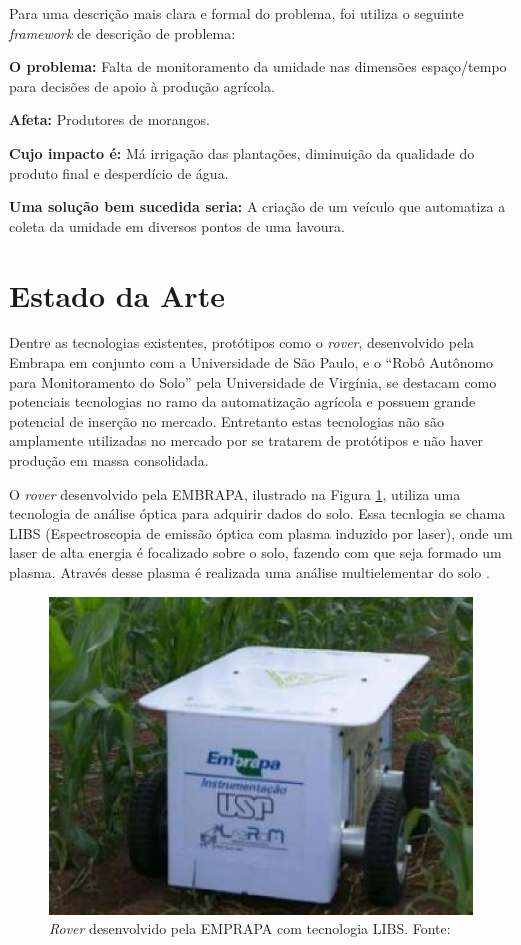   Para uma descrição mais clara e formal do problema, foi utiliza o seguinte
  \textit{framework} de descrição de problema:

  \textbf{O problema:} Falta de monitoramento da umidade nas dimensões espaço/tempo
  para decisões de apoio à produção agrícola.

  \textbf{Afeta:} Produtores de morangos.

  \textbf{Cujo impacto é:} Má irrigação das plantações, diminuição da qualidade
  do produto final e desperdício de água.

  \textbf{Uma solução bem sucedida seria:} A criação de um veículo que automatiza
  a coleta da umidade em diversos pontos de uma lavoura.

  \vfill
  \pagebreak

  \section{Estado da Arte}

  Dentre as tecnologias existentes, protótipos como o \textit{rover}, desenvolvido pela
  Embrapa em conjunto com a Universidade de São Paulo, e o “Robô Autônomo para
  Monitoramento do Solo” pela Universidade de Virgínia, se destacam como
  potenciais tecnologias no ramo da automatização agrícola e possuem grande
  potencial de inserção no mercado.  Entretanto estas tecnologias não são
  amplamente utilizadas no mercado por se tratarem de protótipos e não haver
  produção em massa consolidada.

  O \textit{rover} desenvolvido pela EMBRAPA, ilustrado na Figura \ref{fig02}, utiliza uma tecnologia de análise óptica
  para adquirir dados do solo. Essa tecnlogia se chama LIBS (Espectroscopia de
  emissão óptica com plasma induzido por laser), onde um laser de alta energia
  é focalizado sobre o solo, fazendo com que seja formado um plasma.
  Através desse plasma é realizada uma análise multielementar do solo \cite{ARCHILA2014}.

  \begin{figure}[h]
    \centering
    \includegraphics[keepaspectratio=true,scale=0.5]{figuras/fig02.eps}
    \caption{\textit{Rover} desenvolvido pela EMPRAPA com tecnologia LIBS. Fonte: \cite{ARCHILA2014}}
    \label{fig02}
  \end{figure}

